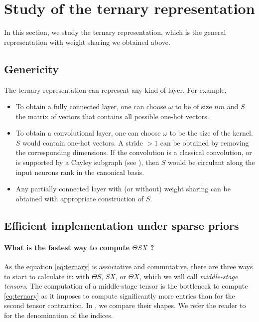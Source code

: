 \section{Study of the ternary representation}

In this section, we study the ternary representation, which is the general representation with weight sharing we obtained above.

\subsection{Genericity}

The ternary representation can represent any kind of layer. For example,
\begin{itemize}
\item To obtain a fully connected layer, one can choose $\omega$ to be of size $nm$ and $S$ the matrix of vectors that contains all possible one-hot vectors.
\item To obtain a convolutional layer, one can choose $\omega$ to be the size of the kernel. $S$ would contain one-hot vectors. A stride $> 1$ can be obtained by removing the corresponding dimensions. If the convolution is a classical convolution, or is supported by a Cayley subgraph (see ), then $S$ would be circulant along the input neurons rank in the canonical basis.
\item Any partially connected layer with (or without) weight sharing can be obtained with appropriate construction of $S$.
\end{itemize}

\subsection{Efficient implementation under sparse priors}

\paragraph{What is the fastest way to compute $\Theta S X$ ?}
As the equation \eqref{eq:ternary} is associative and commutative, there are three ways to start to calculate it: with $\Theta S$, $SX$, or $\Theta X$, which we will call \emph{middle-stage tensors}. The computation of a middle-stage tensor is the bottleneck to compute \eqref{eq:ternary} as it imposes to compute significantly more entries than for the second tensor contraction. In , we compare their shapes. We refer the reader to  for the denomination of the indices.

